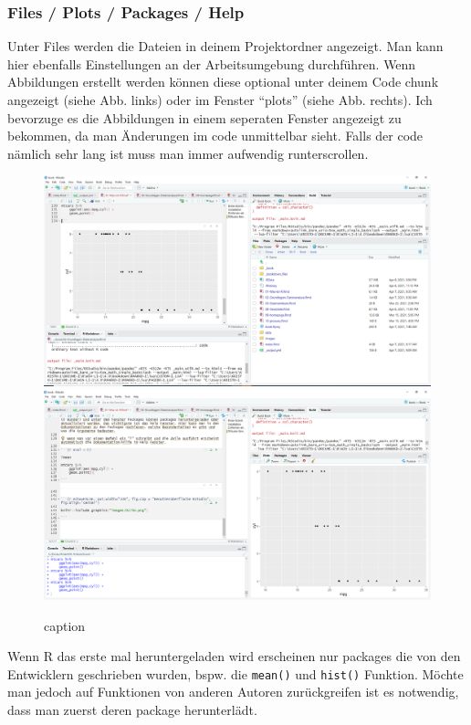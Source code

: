 \documentclass[
]{article}
\begin{document}
\hypertarget{files-plots-packages-help}{%
\subsubsection{Files / Plots / Packages / Help}\label{files-plots-packages-help}}

Unter Files werden die Dateien in deinem Projektordner angezeigt. Man kann hier ebenfalls Einstellungen an der Arbeitsumgebung durchführen. Wenn Abbildungen erstellt werden können diese optional unter deinem Code chunk angezeigt (siehe Abb. links) oder im Fenster ``plots'' (siehe Abb. rechts). Ich bevorzuge es die Abbildungen in einem seperaten Fenster angezeigt zu bekommen, da man Änderungen im code unmittelbar sieht. Falls der code nämlich sehr lang ist muss man immer aufwendig runterscrollen.

\begin{figure}

{\centering \includegraphics[width=0.49\linewidth,height=0.2\textheight]{images/009} \includegraphics[width=0.49\linewidth,height=0.2\textheight]{images/010} 

}

\caption{caption}\label{fig:unnamed-chunk-16}
\end{figure}

Wenn R das erste mal heruntergeladen wird erscheinen nur packages die von den Entwicklern geschrieben wurden, bspw. die \texttt{mean()} und \texttt{hist()} Funktion. Möchte man jedoch auf Funktionen von anderen Autoren zurückgreifen ist es notwendig, dass man zuerst deren package herunterlädt.
\end{document}
